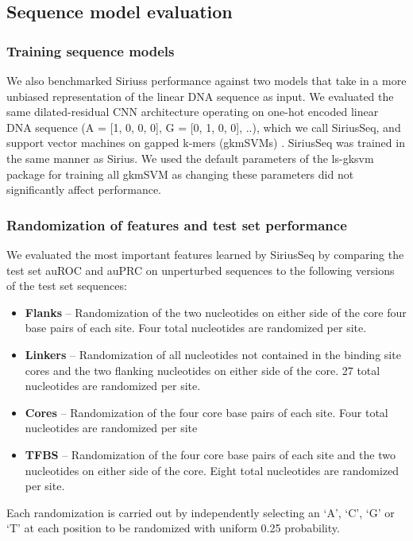 \subsection{Sequence model evaluation}

\subsubsection{Training sequence models}
We also benchmarked Sirius\textquotesingle s performance against two models that take in a more unbiased representation of the linear DNA sequence as input. We evaluated the same dilated-residual CNN architecture operating on one-hot encoded linear DNA sequence (A = [1, 0, 0, 0], G = [0, 1, 0, 0], ..), which we call SiriusSeq, and support vector machines on gapped k-mers (gkmSVMs) \cite{Ghandi2014-hn}. SiriusSeq was trained in the same manner as Sirius. We used the default parameters of the ls-gksvm package for training all gkmSVM as changing these parameters did not significantly affect performance.

\subsubsection{Randomization of features and test set performance}
We evaluated the most important features learned by SiriusSeq by comparing the test set auROC and auPRC on unperturbed sequences to the following versions of the test set sequences:

\begin{itemize}
    \item \textbf{Flanks} – Randomization of the two nucleotides on either side of the core four base pairs of each site. Four total nucleotides are randomized per site.
    \item \textbf{Linkers} – Randomization of all nucleotides not contained in the binding site cores and the two flanking nucleotides on either side of the core. 27 total nucleotides are randomized per site.
    \item \textbf{Cores} – Randomization of the four core base pairs of each site. Four total nucleotides are randomized per site
    \item \textbf{TFBS} – Randomization of the four core base pairs of each site and the two nucleotides on either side of the core. Eight total nucleotides are randomized per site.
\end{itemize}

Each randomization is carried out by independently selecting an ‘A’, ‘C’, ‘G’ or ‘T’ at each position to be randomized with uniform 0.25 probability.


